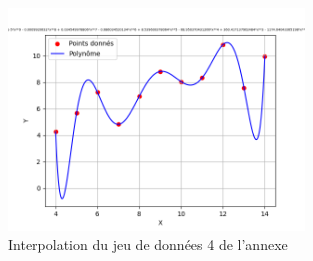 \begin{figure}[h]
    \centering
    \includegraphics[width=0.7\textwidth]{sources/max/res44.-fig.png}
    \caption{Interpolation du jeu de données 4 de l'annexe}
\end{figure}